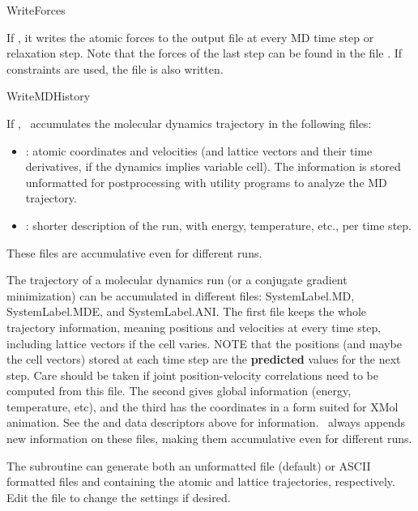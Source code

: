 \begin{fdflogicalF}{WriteForces}

  If \fdftrue, it writes the atomic forces to the output file at every
  MD time step or relaxation step.  Note that the forces of the last
  step can be found in the file . If constraints are used,
  the file  is also written.

\end{fdflogicalF}

\begin{fdflogicalF}{WriteMDHistory}

  If \fdftrue, \siesta\ accumulates the molecular dynamics trajectory
  in the following files:
  \begin{itemize}
    \item%
     : atomic coordinates and velocities (and lattice
    vectors and their time derivatives, if the dynamics implies
    variable cell). The information is stored unformatted for
    postprocessing with utility programs to analyze the MD trajectory.

    \item%
     : shorter description of the run, with energy,
    temperature, etc., per time step.

  \end{itemize}
  These files are accumulative even for different runs.


  The trajectory of a molecular dynamics run (or a conjugate gradient
  minimization) can be accumulated in different files: SystemLabel.MD,
  SystemLabel.MDE, and SystemLabel.ANI. The first file keeps the whole
  trajectory information, meaning positions and velocities at every time
  step, including lattice vectors if the cell varies. NOTE that the
  positions (and maybe the cell vectors) stored at each time step are
  the \textbf{predicted} values for the next step. Care should be taken if
  joint position-velocity correlations need to be computed from this
  file.  The second gives global information (energy, temperature, etc),
  and the third has the coordinates in a form suited for XMol animation.
  See the  and  data descriptors
  above for information. \siesta\ always appends new information on
  these files, making them accumulative even for different runs.

  The  subroutine can generate both an unformatted file
   (default) or ASCII formatted files  and
   containing the atomic and lattice trajectories,
  respectively. Edit the file to change the settings if desired.

\end{fdflogicalF}



